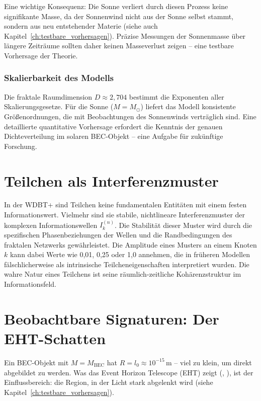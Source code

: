 Eine wichtige Konsequenz: Die Sonne verliert durch diesen Prozess 
keine signifikante Masse, da der Sonnenwind nicht aus der Sonne 
selbst stammt, sondern aus neu entstehender Materie (siehe auch Kapitel~\ref{ch:testbare_vorhersagen}). 
Präzise Messungen der Sonnenmasse über längere Zeiträume 
sollten daher keinen Masseverlust zeigen – eine testbare 
Vorhersage der Theorie.

\subsubsection{Skalierbarkeit des Modells}
\label{sub:kosmo_skalierbarkeit}

Die fraktale Raumdimension \( D \approx 2,704 \) bestimmt die 
Exponenten aller Skalierungsgesetze. Für die Sonne (\( M = M_{\odot} \)) 
liefert das Modell konsistente Größenordnungen, die mit 
Beobachtungen des Sonnenwinds verträglich sind. Eine detaillierte 
quantitative Vorhersage erfordert die Kenntnis der genauen 
Dichteverteilung im solaren BEC-Objekt – eine Aufgabe für 
zukünftige Forschung.

\section{Teilchen als Interferenzmuster}
\label{sec:kosmo_teilchen_interferenz}

In der WDBT+ sind Teilchen keine fundamentalen Entitäten mit einem festen Informationswert. Vielmehr sind sie stabile, nichtlineare Interferenzmuster der komplexen Informationswellen \( I_k^{(n)} \). Die Stabilität dieser Muster wird durch die spezifischen Phasenbeziehungen der Wellen und die Randbedingungen des fraktalen Netzwerks gewährleistet. Die Amplitude eines Musters an einem Knoten \( k \) kann dabei Werte wie 0,01, 0,25 oder 1,0 annehmen, die in früheren Modellen fälschlicherweise als intrinsische Teilcheneigenschaften interpretiert wurden. Die wahre Natur eines Teilchens ist seine räumlich-zeitliche Kohärenzstruktur im Informationsfeld.

\section{Beobachtbare Signaturen: Der EHT-Schatten}
\label{sec:kosmo_eht}

Ein BEC-Objekt mit \( M = M_{\text{BEC}} \) hat \( R = l_0 \approx 10^{-15} \, \text{m} \) – viel zu klein, um direkt abgebildet zu werden. Was das Event Horizon Telescope (EHT) zeigt (\cite{EHT2019}, \cite{EHT2022}), ist der Einflussbereich: die Region, in der Licht stark abgelenkt wird (siehe Kapitel~\ref{ch:testbare_vorhersagen}).

